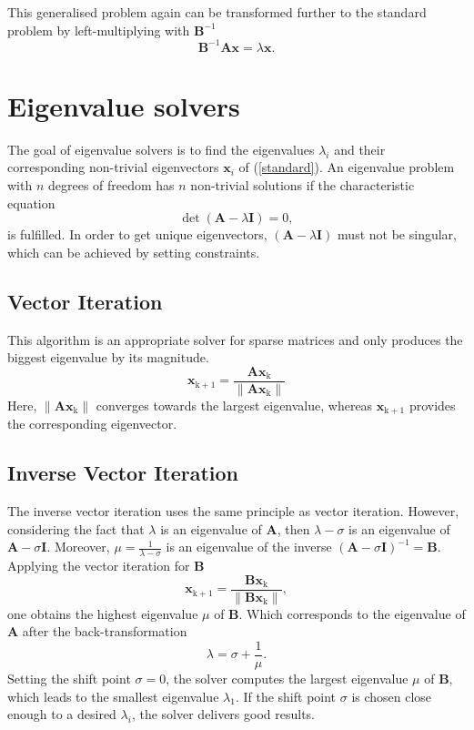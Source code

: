 \documentclass[conference]{journal}
\begin{document}
	This generalised problem again can be transformed further to the standard problem by left-multiplying with $\textbf{B}^{-1}$
	\begin{equation}
	\textbf{B}^{-1}\textbf{A\^x}=\lambda\textbf{\^x}.
	\end{equation}
	
	
	\section{Eigenvalue solvers}
	The goal of eigenvalue solvers is to find the eigenvalues $\lambda_i$ and their corresponding non-trivial eigenvectors $\textbf{\^x}_i$ of (\ref{standard}). An eigenvalue problem with $n$ degrees of freedom has $n$ non-trivial solutions if the characteristic equation
	\begin{equation}
	\det (\textbf{A}-\lambda\textbf{I})=0,
	\end{equation}
	is fulfilled. In order to get unique eigenvectors, $(\textbf{A}-\lambda\textbf{I})$ must not be singular, which can be achieved by setting constraints. 
	
	\subsection*{Vector Iteration}
	This algorithm is an appropriate solver for sparse matrices and only produces the biggest eigenvalue by its magnitude.  
	\begin{equation}
	\textbf{\^x}_\mathrm{k+1}=\frac{\textbf{A\^x}_\mathrm{k}}{\lVert \textbf{A\^x}_\mathrm{k} \rVert}
	\end{equation}
	Here, $\lVert \textbf{A\^x}_\mathrm{k} \rVert$ converges towards the largest eigenvalue, whereas $\textbf{\^x}_\mathrm{k+1}$ provides the corresponding eigenvector.
	
	\subsection*{Inverse Vector Iteration}
	The inverse vector iteration uses the same principle as vector iteration. However, considering the fact that $\lambda$ is an eigenvalue of $\textbf{A}$, then $\lambda-\sigma$ is an eigenvalue of $\textbf{A}-\sigma\textbf{I}$. Moreover, $\mu=\frac{1}{\lambda - \sigma} $ is an eigenvalue of the inverse $ (\textbf{A}-\sigma \textbf{I})^{-1}= \textbf{B}$. 
	Applying the vector iteration for $\textbf{B}$ 
	\begin{equation}
	\textbf{\^x}_\mathrm{k+1}=\frac{\textbf{B\^x}_\mathrm{k}}{\lVert \textbf{B\^x}_\mathrm{k} \rVert},
	\end{equation}
	one obtains the highest eigenvalue $\mu$ of $\textbf{B}$. Which corresponds to the eigenvalue of $\textbf{A}$ after the back-transformation
	\begin{equation}
	\lambda=\sigma+\frac{1}{\mu}.
	\end{equation}
	Setting the shift point $\sigma=0$, the solver computes the largest eigenvalue $\mu$ of $\textbf{B}$, which leads to the smallest eigenvalue $\lambda_1$. If the shift point $\sigma$ is chosen close enough to a desired $\lambda_i$, the solver delivers good results.
	
\end{document}

